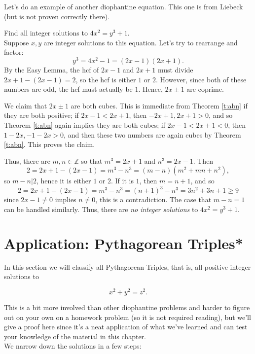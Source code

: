 \documentclass[11pt,dvipsnames]{book}
\numberwithin{equation}{section} %
\numberwithin{figure}{section} %
\numberwithin{table}{section} %
\begin{document}
Let's do an example of another diophantine equation. This one is from Liebeck (but is not proven correctly there).

\begin{example}
Find all integer solutions to $4x^2=y^3+1$. \\

Suppose $x,y$ are integer solutions to this equation. Let's try to rearrange and factor:
\[
y^3=4x^2-1=(2x-1)(2x+1).
\]
By the Easy Lemma, the hcf of $2x-1$ and $2x+1$ must divide $2x+1-(2x-1)=2$, so the hcf is either $1$ or $2$. However, since both of these numbers are odd, the hcf must actually be $1$. Hence, $2x\pm 1$ are coprime.  

We claim that $2x\pm 1$ are both cubes. This is immediate from Theorem \ref{t:abn} if they are both positive; if $2x-1<2x+1$, then $-2x+1,2x+1>0$, and so Theorem \ref{t:abn} again implies they are both cubes; if $2x-1<2x+1<0$, then $1-2x,-1-2x>0$, and then these two numbers are again cubes by Theorem \ref{t:abn}. This proves the claim. 

Thus, there are $m,n\in\mathbb{Z}$ so that $m^3=2x+1$ and $n^3=2x-1$. Then 
\[
2=2x+1-(2x-1)=m^3-n^3=(m-n)(m^2+mn+n^2),\]
so $m-n|2$, hence it is either $1$ or $2$. If it is $1$, then $m=n+1$, and so
\[
2=2x+1-(2x-1)=m^3-n^3=(n+1)^3-n^3=3n^2+3n+1\geq 9\]
since $2x-1\neq 0$ implies $n\neq 0$, this is a contradiction. The case that $m-n=1$ can be handled similarly. Thus, there are {\it no integer solutions} to $4x^2=y^3+1$. 

\end{example}



 \section{Application: Pythagorean Triples*}
 
In this section we will classify all Pythagorean Triples, that is, all positive integer solutions to 

\[
x^2+y^2=z^2.
\]


This is a bit more involved than other diophantine problems and harder to figure out on your own on a homework problem (so it is not required reading), but we'll give a proof here since it's a neat application of what we've learned and can test your knowledge of the material in this chapter. \\

We narrow down the solutions in a few steps:
\end{document}
